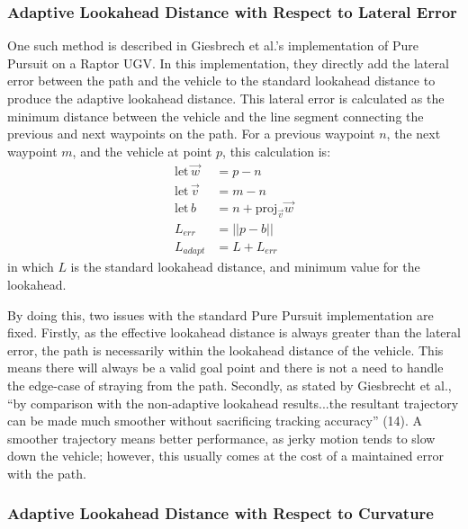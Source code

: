 \documentclass[mla8alt]{mla}
\begin{document}
\begin{paper}
\subsubsection{Adaptive Lookahead Distance with Respect to Lateral Error}

One such method is described in Giesbrech et al.'s implementation of Pure Pursuit on a Raptor UGV. In this implementation, they directly add the lateral error between the path and the vehicle to the standard lookahead distance to produce the adaptive lookahead distance. This lateral error is calculated as the minimum distance between the vehicle and the line segment connecting the previous and next waypoints on the path. For a previous waypoint $n$, the next waypoint $m$, and the vehicle at point $p$, this calculation is:
\begin{subequations}
\begin{align}
\text{let}\,\vec{w} &= p - n \\
\text{let}\,\vec{v} &= m - n \\
\text{let}\, b &= n + \text{proj}_{\vec{v}}\vec{w} \label{eqn:nearestPoint}\\
L_{err} &= ||p-b|| \\
L_{adapt} &= L + L_{err}
\end{align}
\end{subequations}
in which $L$ is the standard lookahead distance, and minimum value for the lookahead.

By doing this, two issues with the standard Pure Pursuit implementation are fixed. Firstly, as the effective lookahead distance is always greater than the lateral error, the path is necessarily within the lookahead distance of the vehicle. This means there will always be a valid goal point and there is not a need to handle the edge-case of straying from the path. Secondly, as stated by Giesbrecht et al., ``by comparison with the non-adaptive lookahead results...the resultant trajectory can be made much smoother without sacrificing tracking accuracy'' (14). A smoother trajectory means better performance, as jerky motion tends to slow down the vehicle; however, this usually comes at the cost of a maintained error with the path.

\subsubsection{Adaptive Lookahead Distance with Respect to Curvature}


\end{paper}
\end{document}
